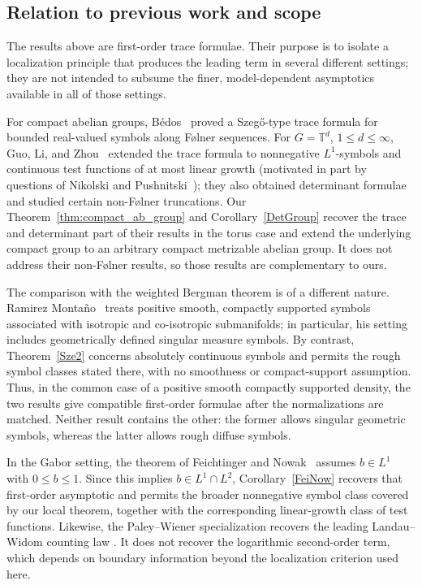 \documentclass{amsart}
\theoremstyle{definition}
\theoremstyle{remark}
\numberwithin{equation}{section}
\begin{document}
\subsection{Relation to previous work and scope}

The results above are first-order trace formulae.  Their purpose is to isolate a localization principle that produces the leading term in several different settings; they are not intended to subsume the finer, model-dependent asymptotics available in all of those settings.

For compact abelian groups, B\'edos~\cite{bedos1996folner} proved a Szeg\H{o}-type trace formula for bounded real-valued symbols along F{\o}lner sequences. For \(G=\mathbb T^d\), \(1\leq d\leq\infty\), Guo, Li, and Zhou~\cite{guo2024first} extended the trace formula to nonnegative \(L^1\)-symbols and continuous test functions of at most linear growth (motivated in part by questions of Nikolski and Pushnitski~\cite{nikolski2020szeg}); they also obtained determinant formulae and studied certain non-F{\o}lner
truncations. Our Theorem~\ref{thm:compact_ab_group} and Corollary~\ref{DetGroup} recover the trace and determinant part of their results in the torus case and extend the underlying compact group to an arbitrary compact
metrizable abelian group.  It does not address their 
non-F{\o}lner results, so those results are complementary to ours.

The comparison with the weighted Bergman theorem is of a different nature.
Ramirez Monta{\~n}o~\cite{RamirezMontano} treats positive smooth,
compactly supported symbols associated with isotropic and co-isotropic
submanifolds; in particular, his setting includes geometrically defined
singular measure symbols.  By contrast, Theorem~\ref{Sze2} concerns absolutely
continuous symbols and permits the rough symbol classes stated there, with
no smoothness or compact-support assumption.  Thus, in the common case of a
positive smooth compactly supported density, the two results give compatible
first-order formulae after the normalizations are matched.  Neither result
contains the other: the former allows singular geometric symbols, whereas
the latter allows rough diffuse symbols.

In the Gabor setting, the theorem of Feichtinger and
Nowak~\cite{FN01} assumes \(b\in L^1\) with \(0\leq b\leq1\).
Since this implies \(b\in L^1\cap L^2\), Corollary~\ref{FeiNow} recovers that
first-order asymptotic and permits the broader nonnegative symbol class
covered by our local theorem, together with the corresponding
linear-growth class of test functions.  Likewise, the Paley--Wiener
specialization recovers the leading Landau--Widom counting law
\cite{landau1980eigenvalue}.  It does not recover the logarithmic second-order term,
which depends on boundary information beyond the localization criterion used
here.
\end{document}
